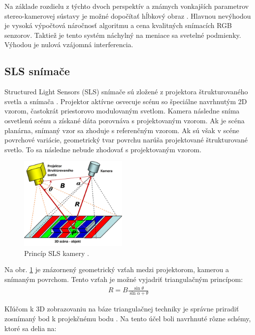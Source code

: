 Na základe rozdielu z týchto dvoch perspektív a známych vonkajších parametrov stereo-kamerovej sústavy je možné dopočítať hĺbkový obraz \cite{kala2016road}. Hlavnou nevýhodou je vysoká výpočtová náročnosť algoritmu a cena kvalitných snímacích RGB senzorov. Taktiež je tento systém náchylný na meniace sa svetelné podmienky. Výhodou je nulová vzájomná interferencia.

\subsection{SLS snímače}
\label{sec:sls}
Structured Light Sensors (SLS) snímače sú zložené z projektora štrukturovaného svetla a snímača \cite{Geng}. Projektor aktívne osvecuje scénu so špeciálne navrhnutým 2D vzorom, častokrát priestorovo modulovaným svetlom. Kamera následne sníma osvetlenú scénu a získané dáta porovnáva s projektovaným vzorom. Ak je scéna planárna, snímaný vzor sa zhoduje s referenčným vzorom. Ak sú však v scéne povrchové variácie, geometrický tvar povrchu narúša projektované štrukturované svetlo. To sa následne nebude zhodovať s projektovaným vzorom.

\begin{figure}[H]
	\centering
	\includegraphics[width=0.47\textwidth]{figures/SLS.jpeg} 
	\caption{Princíp SLS kamery \cite{Geng}.}
	\label{fig:sls}
\end{figure}

Na obr. \ref{fig:sls} je znázornený geometrický vzťah medzi projektorom, kamerou a snímaným povrchom. Tento vzťah je možné vyjadriť triangulačným princípom:
\begin{equation}
\label{eq1}
\begin{aligned}
R=B\frac{\sin\theta}{\sin\alpha + \theta}
\end{aligned}
\end{equation}

Kľúčom k 3D zobrazovaniu na báze triangulačnej techniky je správne priradiť zosnímaný bod
k projekčnému bodu \cite{Geng}. Na tento účel boli navrhnuté rôzne schémy, ktoré sa delia na:

